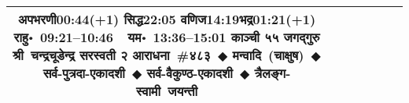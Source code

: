 \documentclass[a3paper,12pt,landscape]{article}
\newcommand{\eventsep}{~$\Diamondblack$ }
\newcommand{\To}{\hspace{1pt}\raisebox{0pt}{\tiny\RIGHTarrow}\hspace{1pt}}
\newcommand{\rahuyama}[2]{%
{राहु॰~\textsf{#1}~~यम॰~\textsf{#2}}
}
\begin{document}
\begin{center}
\begin{tabular}{|c|c|c|c|c|c|c|}
{{\mbox{अपभरणी\To{}\textsf{00:44(+1)\hspace{2ex}}}}%
{\mbox{सिद्ध\To{}\textsf{22:05\hspace{2ex}}}}%
{\mbox{वणिज\To{}\textsf{14:19\hspace{2ex}}}\mbox{भद्र\To{}\textsf{01:21(+1)\hspace{2ex}}}}}%
{\rahuyama{09:21--10:46}{13:36--15:01}}%
{काञ्ची ५५ जगद्गुरु श्री~चन्द्रचूडेन्द्र सरस्वती २ आराधना~\#{४८३}\eventsep मन्वादि~(चाक्षुष)\eventsep सर्व-पुत्रदा-एकादशी\eventsep सर्व-वैकुण्ठ-एकादशी\eventsep त्रैलङ्ग-स्वामी~जयन्ती}
\\ \hline %
\end{tabular}



\end{center}
\end{document}
